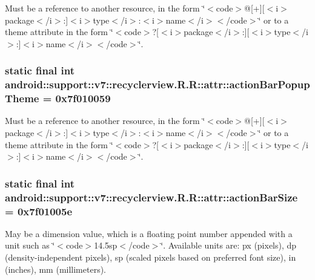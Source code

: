 Must be a reference to another resource, in the form \char`\"{}$<$code$>$@\mbox{[}+\mbox{]}\mbox{[}$<$i$>$package$<$/i$>$:\mbox{]}$<$i$>$type$<$/i$>$:$<$i$>$name$<$/i$>$$<$/code$>$\char`\"{} or to a theme attribute in the form \char`\"{}$<$code$>$?\mbox{[}$<$i$>$package$<$/i$>$:\mbox{]}\mbox{[}$<$i$>$type$<$/i$>$:\mbox{]}$<$i$>$name$<$/i$>$$<$/code$>$\char`\"{}. \hypertarget{classandroid_1_1support_1_1v7_1_1recyclerview_1_1_r_1_1attr_88c7b9a3173d079277200b53ff537fa8}{
\subsubsection[{actionBarPopupTheme}]{\setlength{\rightskip}{0pt plus 5cm}static final int android::support::v7::recyclerview.R.R::attr::actionBarPopupTheme = 0x7f010059}}
\label{classandroid_1_1support_1_1v7_1_1recyclerview_1_1_r_1_1attr_88c7b9a3173d079277200b53ff537fa8}


Must be a reference to another resource, in the form \char`\"{}$<$code$>$@\mbox{[}+\mbox{]}\mbox{[}$<$i$>$package$<$/i$>$:\mbox{]}$<$i$>$type$<$/i$>$:$<$i$>$name$<$/i$>$$<$/code$>$\char`\"{} or to a theme attribute in the form \char`\"{}$<$code$>$?\mbox{[}$<$i$>$package$<$/i$>$:\mbox{]}\mbox{[}$<$i$>$type$<$/i$>$:\mbox{]}$<$i$>$name$<$/i$>$$<$/code$>$\char`\"{}. \hypertarget{classandroid_1_1support_1_1v7_1_1recyclerview_1_1_r_1_1attr_ef4ee19c5633711137823266c474a8a7}{
\subsubsection[{actionBarSize}]{\setlength{\rightskip}{0pt plus 5cm}static final int android::support::v7::recyclerview.R.R::attr::actionBarSize = 0x7f01005e}}
\label{classandroid_1_1support_1_1v7_1_1recyclerview_1_1_r_1_1attr_ef4ee19c5633711137823266c474a8a7}


May be a dimension value, which is a floating point number appended with a unit such as \char`\"{}$<$code$>$14.5sp$<$/code$>$\char`\"{}. Available units are: px (pixels), dp (density-independent pixels), sp (scaled pixels based on preferred font size), in (inches), mm (millimeters). 

